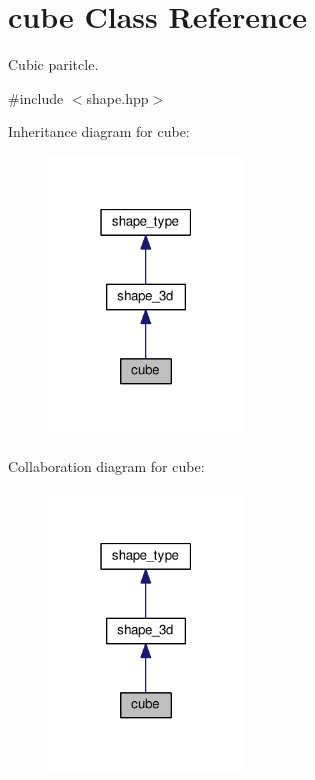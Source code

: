 \hypertarget{classcube}{}\section{cube Class Reference}
\label{classcube}


Cubic paritcle.  




{\ttfamily \#include $<$shape.\+hpp$>$}



Inheritance diagram for cube\+:
\nopagebreak
\begin{figure}[H]
\begin{center}
\leavevmode
\includegraphics[width=147pt]{d2/dcc/classcube__inherit__graph}
\end{center}
\end{figure}


Collaboration diagram for cube\+:
\nopagebreak
\begin{figure}[H]
\begin{center}
\leavevmode
\includegraphics[width=147pt]{d7/dea/classcube__coll__graph}
\end{center}
\end{figure}
